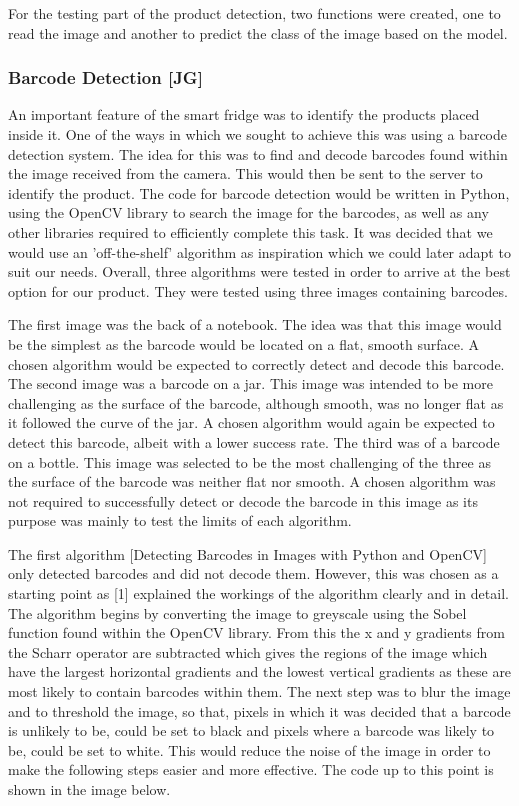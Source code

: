 For the testing part of the product detection, two functions were created, one to read the image and another to predict the class of the image based on the model.

\subsubsection{Barcode Detection [JG]}

An important feature of the smart fridge was to identify the products placed inside it.
One of the ways in which we sought to achieve this was using a barcode detection system.
The idea for this was to find and decode barcodes found within the image received from the camera.
This would then be sent to the server to identify the product.
The code for barcode detection would be written in Python, using the OpenCV library to search the image for the barcodes, as well as any other libraries required to efficiently complete this task.
It was decided that we would use an 'off-the-shelf' algorithm as inspiration which we could later adapt to suit our needs.
Overall, three algorithms were tested in order to arrive at the best option for our product.
They were tested using three images containing barcodes.

The first image was the back of a notebook.
The idea was that this image would be the simplest as the barcode would be located on a flat, smooth surface.
A chosen algorithm would be expected to correctly detect and decode this barcode.
The second image was a barcode on a jar.
This image was intended to be more challenging as the surface of the barcode, although smooth, was no longer flat as it followed the curve of the jar.
A chosen algorithm would again be expected to detect this barcode, albeit with a lower success rate.
The third was of a barcode on a bottle.
This image was selected to be the most challenging of the three as the surface of the barcode was neither flat nor smooth.
A chosen algorithm was not required to successfully detect or decode the barcode in this image as its purpose was mainly to test the limits of each algorithm.

The first algorithm [Detecting Barcodes in Images with Python and OpenCV] only detected barcodes and did not decode them.
However, this was chosen as a starting point as [1] explained the workings of the algorithm clearly and in detail.
The algorithm begins by converting the image to greyscale using the Sobel function found within the OpenCV library.
From this the x and y gradients from the Scharr operator are subtracted which gives the regions of the image which have the largest horizontal gradients and the lowest vertical gradients as these are most likely to contain barcodes within them.
The next step was to blur the image and to threshold the image, so that, pixels in which it was decided that a barcode is unlikely to be, could be set to black and pixels where a barcode was likely to be, could be set to white.
This would reduce the noise of the image in order to make the following steps easier and more effective.
The code up to this point is shown in the image below.

